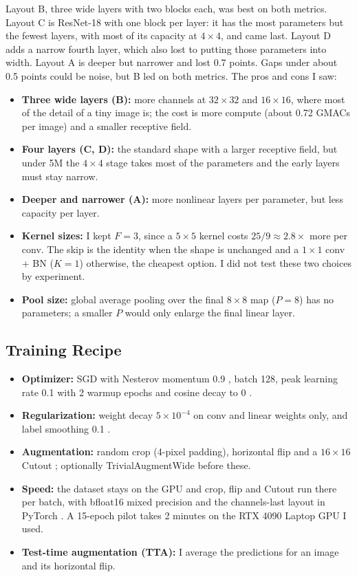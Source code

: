 \documentclass[letterpaper]{article}
\begin{document}
Layout B, three wide layers with two blocks each, was best on both metrics. Layout C is ResNet-18 with one block per
layer: it has the most parameters but the fewest layers, with most of its capacity at $4\times4$, and came last.
Layout D adds a narrow fourth layer, which also lost to putting those parameters into width. Layout A is deeper but
narrower and lost 0.7 points. Gaps under about 0.5 points could be noise, but B led on both metrics. The pros and cons
I saw:
\begin{itemize}
\item \textbf{Three wide layers (B):} more channels at $32\times32$ and $16\times16$, where most of the detail of a
tiny image is; the cost is more compute (about 0.72 GMACs per image) and a smaller receptive field.
\item \textbf{Four layers (C, D):} the standard shape with a larger receptive field, but under 5M the $4\times4$
stage takes most of the parameters and the early layers must stay narrow.
\item \textbf{Deeper and narrower (A):} more nonlinear layers per parameter, but less capacity per layer.
\item \textbf{Kernel sizes:} I kept $F=3$, since a $5\times5$ kernel costs $25/9\approx2.8\times$ more per conv. The
skip is the identity when the shape is unchanged and a $1\times1$ conv + BN ($K=1$) otherwise, the cheapest
option. I did not test these two choices by experiment.
\item \textbf{Pool size:} global average pooling over the final $8\times8$ map ($P=8$) has no parameters; a smaller
$P$ would only enlarge the final linear layer.
\end{itemize}

\subsection{Training Recipe}
\begin{itemize}
\item \textbf{Optimizer:} SGD with Nesterov momentum 0.9 \cite{sutskever2013importance}, batch 128, peak learning
rate 0.1 with 2 warmup epochs \cite{goyal2017accurate} and cosine decay to 0 \cite{loshchilov2017sgdr}.
\item \textbf{Regularization:} weight decay $5\times10^{-4}$ on conv and linear weights only, and label smoothing
0.1 \cite{szegedy2016rethinking}.
\item \textbf{Augmentation:} random crop (4-pixel padding), horizontal flip and a $16\times16$ Cutout
\cite{devries2017improved}; optionally TrivialAugmentWide \cite{muller2021trivialaugment} before these.
\item \textbf{Speed:} the dataset stays on the GPU and crop, flip and Cutout run there per batch, with bfloat16 mixed
precision and the channels-last layout in PyTorch \cite{paszke2019pytorch}. A 15-epoch pilot takes 2 minutes on
the RTX 4090 Laptop GPU I used.
\item \textbf{Test-time augmentation (TTA):} I average the predictions for an image and its horizontal flip.
\end{itemize}
\end{document}
